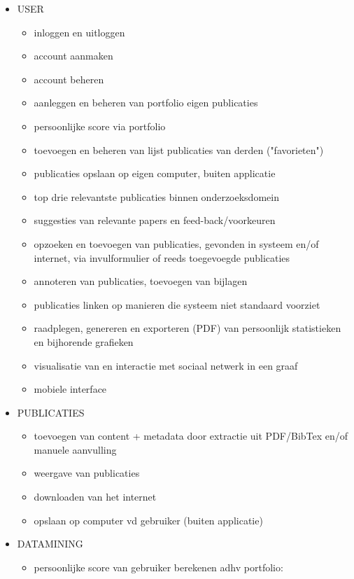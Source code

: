 \documentclass{article}
\begin{document}
\begin{itemize}
    \item USER
    \begin{itemize}
        \item inloggen en uitloggen 
        \item account aanmaken
        \item account beheren 
        \item aanleggen en beheren van portfolio eigen publicaties
        \item persoonlijke score via portfolio
	\item toevoegen en beheren van lijst publicaties van derden ("favorieten")
	\item publicaties opslaan op eigen computer, buiten applicatie
	\item top drie relevantste publicaties binnen onderzoeksdomein 
	\item suggesties van relevante papers en feed-back/voorkeuren 
	\item opzoeken en toevoegen van publicaties, gevonden in systeem en/of internet, via invulformulier of reeds toegevoegde publicaties
	\item annoteren van publicaties, toevoegen van bijlagen 
	\item publicaties linken op manieren die systeem niet standaard voorziet
	\item raadplegen, genereren en exporteren (PDF) van persoonlijk statistieken en bijhorende grafieken
	\item visualisatie van en interactie met sociaal netwerk in een graaf
	\item mobiele interface
    \end{itemize}
    \item PUBLICATIES 
    \begin{itemize}
    \item toevoegen van content + metadata door extractie uit PDF/BibTex en/of manuele aanvulling
    \item weergave van publicaties 
    \item downloaden van het internet
    \item opslaan op computer vd gebruiker (buiten applicatie)
    \end{itemize}
    \item DATAMINING 
    \begin{itemize}
    \item persoonlijke score van gebruiker berekenen adhv portfolio: 

\end{itemize}
\end{itemize}
\end{document}
